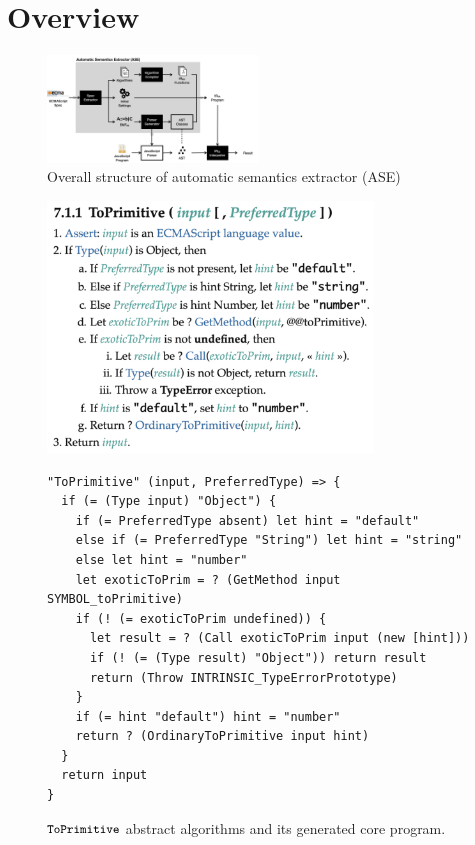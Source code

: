 \section{Overview}

\begin{figure}
  \centering
  \includegraphics[width=0.5\textwidth]{img/overview.png}
  \caption{Overall structure of automatic semantics extractor (ASE)}
  \label{fig:overview}
\end{figure}

\begin{figure}
  \centering
  \includegraphics[height=18em]{img/to_primitive.png}
  \begin{lstlisting}[style=myCorestyle]
"ToPrimitive" (input, PreferredType) => {
  if (= (Type input) "Object") {
    if (= PreferredType absent) let hint = "default"
    else if (= PreferredType "String") let hint = "string"
    else let hint = "number"
    let exoticToPrim = ? (GetMethod input SYMBOL_toPrimitive)
    if (! (= exoticToPrim undefined)) {
      let result = ? (Call exoticToPrim input (new [hint]))
      if (! (= (Type result) "Object")) return result
      return (Throw INTRINSIC_TypeErrorPrototype)
    }
    if (= hint "default") hint = "number"
    return ? (OrdinaryToPrimitive input hint)
  }
  return input
}
  \end{lstlisting}
  \caption{\( \texttt{\small ToPrimitive} \) abstract algorithms
  and its generated core program.}
  \label{fig:to-primitive}
\end{figure}

